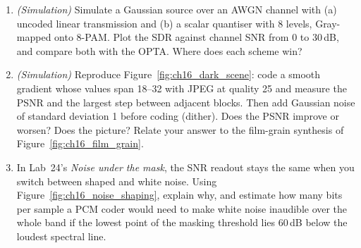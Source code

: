 \begin{enumerate}[label=\thechapter.\arabic*]
``RD-optimised'' zeroing of isolated $\pm1$ coefficients whose removal saves more than $\lambda$ times the
distortion increase. Plot the rate--PSNR curves against the baseline and against libjpeg.
\item \emph{(Simulation)} Simulate a Gaussian source over an AWGN channel with (a) uncoded linear transmission
and (b) a scalar quantiser with 8 levels, Gray-mapped onto 8-PAM. Plot the SDR against channel SNR from 0 to
30\,dB, and compare both with the OPTA. Where does each scheme win?
\item \emph{(Simulation)} Reproduce Figure~\ref{fig:ch16_dark_scene}: code a smooth gradient whose
values span 18--32 with JPEG at quality 25 and measure the PSNR and the largest step between adjacent
blocks. Then add Gaussian noise of standard deviation 1 before coding (dither). Does the PSNR improve
or worsen? Does the picture? Relate your answer to the film-grain synthesis of
Figure~\ref{fig:ch16_film_grain}.
\item In Lab~24's \emph{Noise under the mask}, the SNR readout stays the same when you switch between
shaped and white noise. Using Figure~\ref{fig:ch16_noise_shaping}, explain why, and estimate how many
bits per sample a PCM coder would need to make white noise inaudible over the whole band if the
lowest point of the masking threshold lies 60\,dB below the loudest spectral line.
\end{enumerate}

